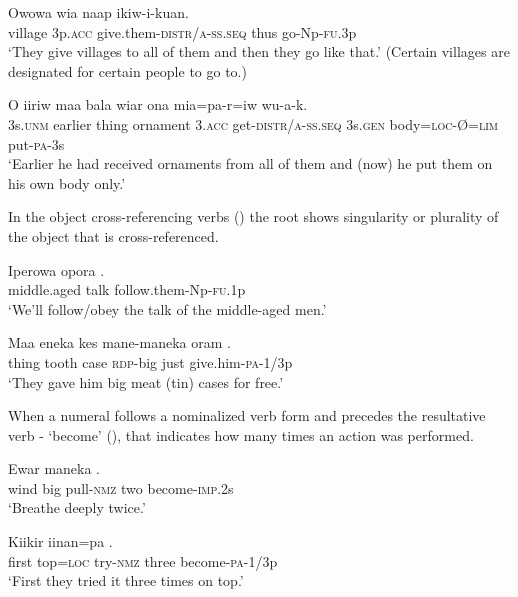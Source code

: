 \ea%
\label{ex:6:x1301}
\gll Owowa  wia    naap  ikiw-i-kuan. \\
village  3p.\textsc{acc}  give.them-\textsc{distr}/\textsc{a}-\textsc{ss}.\textsc{seq}  thus  go-Np-\textsc{fu}.3p\\
\glt `They give villages to all of them and then they go like that.' (Certain villages are designated for certain people to go to.)
\z

\ea%
\label{ex:6:x1302}
\gll O  iiriw  maa  bala  wiar   ona  mia=pa-r=iw  wu-a-k.\\
3s.\textsc{unm}  earlier  thing  ornament  3.\textsc{acc}  get-\textsc{distr}/\textsc{a}-\textsc{ss}.\textsc{seq} 3s.\textsc{gen}  body=\textsc{loc}-{\O}=\textsc{lim}  put-\textsc{pa}-3s\\
\glt `Earlier he had received ornaments from all of them and (now) he put them on his own body only.'
\z

In the object cross-referencing verbs () the root shows singularity or plurality of the object that is cross-referenced.

\ea%
\label{ex:6:x1303}
\gll Iperowa  opora  . \\
middle.aged  talk  follow.them-Np-\textsc{fu}.1p\\
\glt `We'll follow/obey the talk of the middle-aged men.'
\z

\ea%
\label{ex:6:x1304}
\gll Maa  eneka  kes  mane-maneka  oram  . \\
thing  tooth  case  \textsc{rdp}-big  just  give.him-\textsc{pa}-1/3p\\
\glt `They gave him big meat (tin) cases for free.'
\z

When a numeral follows a nominalized verb form and precedes the resultative verb - `become' (), that indicates how many times an action was performed. 

\ea%
\label{ex:6:x1305}
\gll Ewar  maneka      . \\
wind  big  pull-\textsc{nmz}  two  become-\textsc{imp}.2s\\
\glt `Breathe deeply twice.'
\z

\ea%
\label{ex:6:x1306}
\gll Kiikir  iinan=pa     . \\
first  top=\textsc{loc}  try-\textsc{nmz}  three  become-\textsc{pa}-1/3p\\
\glt `First they tried it three times on top.'
\z


